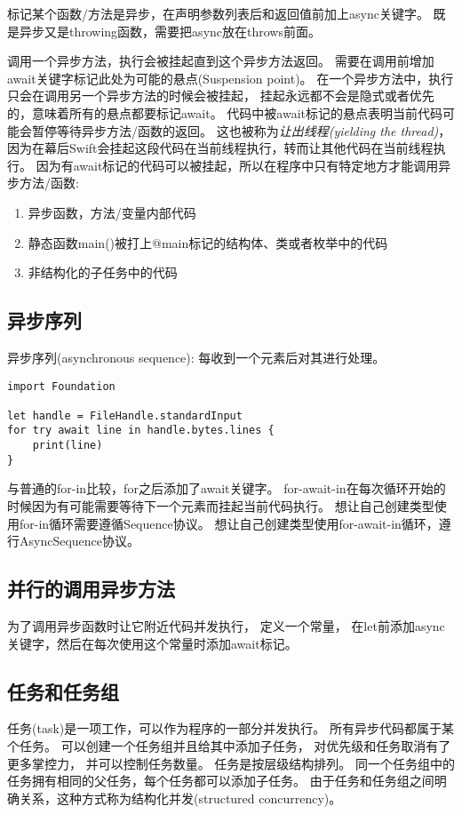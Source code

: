 \documentclass{../main.tex}{subfiles}
\begin{document}
标记某个函数/方法是异步，在声明参数列表后和返回值前加上async关键字。
既是异步又是throwing函数，需要把async放在throws前面。

调用一个异步方法，执行会被挂起直到这个异步方法返回。
需要在调用前增加await关键字标记此处为可能的悬点(Suspension point)。
在一个异步方法中，执行只会在调用另一个异步方法的时候会被挂起，
    挂起永远都不会是隐式或者优先的，意味着所有的悬点都要标记await。
代码中被await标记的悬点表明当前代码可能会暂停等待异步方法/函数的返回。
这也被称为\emph{让出线程(yielding the thread)}，
因为在幕后Swift会挂起这段代码在当前线程执行，转而让其他代码在当前线程执行。
因为有await标记的代码可以被挂起，所以在程序中只有特定地方才能调用异步方法/函数:
\begin{enumerate}[itemsep=0pt, parsep=0pt, topsep=0pt, partopsep=0pt]
    \item 异步函数，方法/变量内部代码
    \item 静态函数main()被打上@main标记的结构体、类或者枚举中的代码
    \item 非结构化的子任务中的代码
\end{enumerate}
\subsection{异步序列}
异步序列(asynchronous sequence): 每收到一个元素后对其进行处理。
\begin{lstlisting}[style = lstCodeStyleSwift, caption = {异步序列}]
import Foundation

let handle = FileHandle.standardInput
for try await line in handle.bytes.lines {
    print(line)
}
\end{lstlisting}
与普通的for-in比较，for之后添加了await关键字。
for-await-in在每次循环开始的时候因为有可能需要等待下一个元素而挂起当前代码执行。
想让自己创建类型使用for-in循环需要遵循Sequence协议。
想让自己创建类型使用for-await-in循环，遵行AsyncSequence协议。

\subsection{并行的调用异步方法}
为了调用异步函数时让它附近代码并发执行，
    定义一个常量，
    在let前添加async关键字，然后在每次使用这个常量时添加await标记。

\subsection{任务和任务组}
任务(task)是一项工作，可以作为程序的一部分并发执行。
所有异步代码都属于某个任务。
可以创建一个任务组并且给其中添加子任务，
    对优先级和任务取消有了更多掌控力，
    并可以控制任务数量。
任务是按层级结构排列。
同一个任务组中的任务拥有相同的父任务，每个任务都可以添加子任务。
由于任务和任务组之间明确关系，这种方式称为结构化并发(structured concurrency)。
\end{document}
